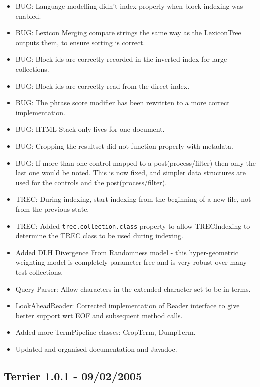 \begin{itemize}
\tightlist
\item
  BUG: Language modelling didn't index properly when block indexing was
  enabled.
\item
  BUG: Lexicon Merging compare strings the same way as the LexiconTree
  outputs them, to ensure sorting is correct.
\item
  BUG: Block ids are correctly recorded in the inverted index for large
  collections.
\item
  BUG: Block ids are correctly read from the direct index.
\item
  BUG: The phrase score modifier has been rewritten to a more correct
  implementation.
\item
  BUG: HTML Stack only lives for one document.
\item
  BUG: Cropping the resultset did not function properly with metadata.
\item
  BUG: If more than one control mapped to a post(process/filter) then
  only the last one would be noted. This is now fixed, and simpler data
  structures are used for the controls and the post(process/filter).
\item
  TREC: During indexing, start indexing from the beginning of a new
  file, not from the previous state.
\item
  TREC: Added \texttt{trec.collection.class} property to allow
  TRECIndexing to determine the TREC class to be used during indexing.
\item
  Added DLH Divergence From Randomness model - this hyper-geometric
  weighting model is completely parameter free and is very robust over
  many test collections.
\item
  Query Parser: Allow characters in the extended character set to be in
  terms.
\item
  LookAheadReader: Corrected implementation of Reader interface to give
  better support wrt EOF and subsequent method calls.
\item
  Added more TermPipeline classes: CropTerm, DumpTerm.
\item
  Updated and organised documentation and Javadoc.
\end{itemize}

\subsection{Terrier 1.0.1 - 09/02/2005}\label{terrier-1.0.1---09022005}

